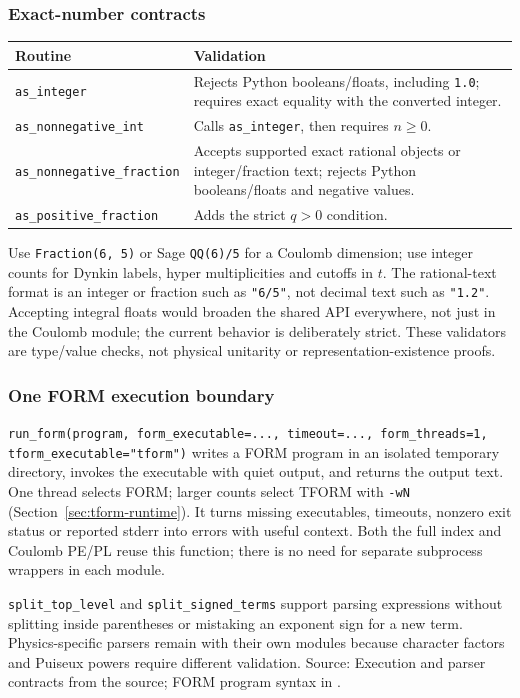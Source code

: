 \documentclass[11pt,a4paper]{article}
\numberwithin{equation}{section}
\newcommand{\code}[1]{{\small\nolinkurl{#1}}}
\newcommand{\src}[1]{{\small\color{muted}Source: #1.}\par}
\begin{document}
\subsubsection{Exact-number contracts}
\begin{tabularx}{\textwidth}{@{}Yp{69mm}@{}}
\toprule Routine & Validation\\\midrule
\code{as_integer} & Rejects Python booleans/floats, including \code{1.0}; requires
exact equality with the converted integer.\\
\code{as_nonnegative_int} & Calls \code{as_integer}, then requires $n\geq0$.\\
\code{as_nonnegative_fraction} & Accepts supported exact rational objects or
integer/fraction text; rejects Python booleans/floats and negative values.\\
\code{as_positive_fraction} & Adds the strict $q>0$ condition.\\\bottomrule
\end{tabularx}
Use \code{Fraction(6, 5)} or Sage \code{QQ(6)/5} for a Coulomb dimension;
use integer counts for Dynkin labels, hyper multiplicities and cutoffs in $t$.
The rational-text format is an integer or fraction such as \code{"6/5"}, not
decimal text such as \code{"1.2"}. Accepting integral floats would broaden the
shared API everywhere, not just in the Coulomb module; the current behavior is
deliberately strict. These validators are type/value checks, not physical
unitarity or representation-existence proofs.

\subsubsection{One FORM execution boundary}
\code{run_form(program, form_executable=..., timeout=..., form_threads=1, tform_executable="tform")} writes a FORM program
in an isolated temporary directory, invokes the executable with quiet output,
and returns the output text. One thread selects FORM; larger counts select
TFORM with \code{-wN} (Section~\ref{sec:tform-runtime}). It turns missing executables, timeouts, nonzero
exit status or reported stderr into errors with useful context. Both the full
index and Coulomb PE/PL reuse this function; there is no need for separate
subprocess wrappers in each module.

\code{split_top_level} and \code{split_signed_terms} support parsing expressions
without splitting inside parentheses or mistaking an exponent sign for a new
term. Physics-specific parsers remain with their own modules because character
factors and Puiseux powers require different validation.
\src{Execution and parser contracts from the source; FORM program syntax
in \cite{form5}}
\end{document}
